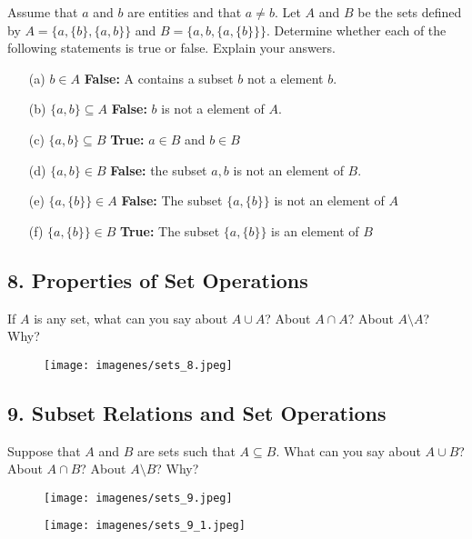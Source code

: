 \documentclass{article}
\begin{document}
Assume that $a$ and $b$ are entities and that $a \neq b$. Let $A$ and $B$ be the sets defined by $A = \{a, \{b\}, \{a, b\}\}$ and $B = \{a, b, \{a, \{b\}\}\}$. Determine whether each of the following statements is true or false. Explain your answers.

\begin{enumerate}
    \item[(a)] $b \in A$ \textbf{False:} A contains a subset $b$ not a element $b$.
    \item[(b)] $\{a, b\} \subseteq A$ \textbf{False:} $b$ is not a element of $A$.
    \item[(c)] $\{a, b\} \subseteq B$ \textbf{True:} $a \in B$ and $b \in B$
    \item[(d)] $\{a, b\} \in B$ \textbf{False:} the subset ${a,b}$ is not an element of $B$. 
    \item[(e)] $\{a, \{b\}\} \in A$ \textbf{False:} The subset $\{a, \{b\}\}$ is not an element of $A$
    \item[(f)] $\{a, \{b\}\} \in B$ \textbf{True:} The subset $\{a, \{b\}\}$ is an element of $B$
\end{enumerate}


\subsection*{8. Properties of Set Operations}

If $A$ is any set, what can you say about $A \cup A$? About $A \cap A$? About $A \setminus A$? Why?

\begin{figure}[H]
\centering
\texttt{[image: imagenes/sets\_8.jpeg]}
\end{figure}

\subsection*{9. Subset Relations and Set Operations}

Suppose that $A$ and $B$ are sets such that $A \subseteq B$. What can you say about $A \cup B$? About $A \cap B$? About $A \setminus B$? Why?

\begin{figure}[H]
\centering
\texttt{[image: imagenes/sets\_9.jpeg]}
\end{figure}

\begin{figure}[H]
\centering
\texttt{[image: imagenes/sets\_9\_1.jpeg]}
\end{figure}
\end{document}
